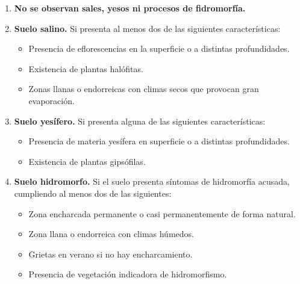 \begin{enumerate}
    \item \textbf{No se observan sales, yesos ni procesos de fidromorfía.}
    \item \textbf{Suelo salino.} Si presenta al menos dos de las siguientes características:
    \begin{itemize}
        \item Presencia de eflorescencias en la superficie o a distintas profundidades.
        \item Existencia de plantas halófitas.
        \item Zonas llanas o endorreicas con climas secos que provocan gran evaporación.
    \end{itemize}
    
    
    \item \textbf{Suelo yesífero.} Si presenta alguna de las siguientes características:
    \begin{itemize}
        \item Presencia de materia yesífera en superficie o a distintas profundidades.
        \item Existencia de plantas gipsófilas.
    \end{itemize}
    
    
    \item \textbf{Suelo hidromorfo.} Si el suelo presenta síntomas de hidromorfía acusada, cumpliendo al menos dos de las siguientes:
    \begin{itemize}
        \item Zona encharcada permanente o casi permanentemente de forma natural.
        \item Zona llana o endorreica con climas húmedos.
        \item Grietas en verano si no hay encharcamiento.
        \item Presencia de vegetación indicadora de hidromorfismo.
    \end{itemize}
\end{enumerate}

